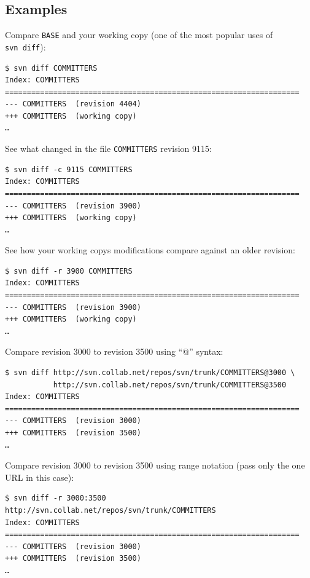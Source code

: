 \subsection{Examples}

Compare \texttt{BASE} and your working copy (one of the most popular
uses of \texttt{svn\ diff}):

\begin{verbatim}
$ svn diff COMMITTERS 
Index: COMMITTERS
===================================================================
--- COMMITTERS  (revision 4404)
+++ COMMITTERS  (working copy)
…
\end{verbatim}

See what changed in the file \texttt{COMMITTERS} revision 9115:

\begin{verbatim}
$ svn diff -c 9115 COMMITTERS 
Index: COMMITTERS
===================================================================
--- COMMITTERS  (revision 3900)
+++ COMMITTERS  (working copy)
…
\end{verbatim}

See how your working copy\textquotesingle s modifications compare
against an older revision:

\begin{verbatim}
$ svn diff -r 3900 COMMITTERS 
Index: COMMITTERS
===================================================================
--- COMMITTERS  (revision 3900)
+++ COMMITTERS  (working copy)
…
\end{verbatim}

Compare revision 3000 to revision 3500 using ``@'' syntax:

\begin{verbatim}
$ svn diff http://svn.collab.net/repos/svn/trunk/COMMITTERS@3000 \
           http://svn.collab.net/repos/svn/trunk/COMMITTERS@3500
Index: COMMITTERS
===================================================================
--- COMMITTERS  (revision 3000)
+++ COMMITTERS  (revision 3500)
…
\end{verbatim}

Compare revision 3000 to revision 3500 using range notation (pass only
the one URL in this case):

\begin{verbatim}
$ svn diff -r 3000:3500 http://svn.collab.net/repos/svn/trunk/COMMITTERS
Index: COMMITTERS
===================================================================
--- COMMITTERS  (revision 3000)
+++ COMMITTERS  (revision 3500)
…
\end{verbatim}

